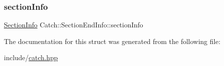 \subsubsection{\texorpdfstring{section\+Info}{sectionInfo}}
{\footnotesize\ttfamily \mbox{\hyperlink{structCatch_1_1SectionInfo}{Section\+Info}} Catch\+::\+Section\+End\+Info\+::section\+Info}



The documentation for this struct was generated from the following file\+:\begin{DoxyCompactItemize}
\item 
include/\mbox{\hyperlink{catch_8hpp}{catch.\+hpp}}\end{DoxyCompactItemize}
